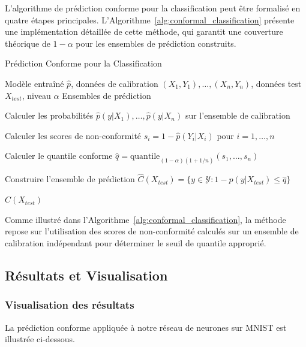 \documentclass[a4paper,12pt]{article}
\begin{document}
L'algorithme de prédiction conforme pour la classification peut être formalisé en quatre étapes principales. L'Algorithme~\ref{alg:conformal_classification} présente une implémentation détaillée de cette méthode, qui garantit une couverture théorique de $1-\alpha$ pour les ensembles de prédiction construits.

\begin{algorithm}
\caption{Prédiction Conforme pour la Classification}
\label{alg:conformal_classification}
\begin{algorithmic}[1]
\REQUIRE Modèle entraîné $\hat{p}$, données de calibration $(X_1, Y_1), \ldots, (X_n, Y_n)$, données test $X_{test}$, niveau $\alpha$
\ENSURE Ensembles de prédiction

\STATE Calculer les probabilités $\hat{p}(y|X_1), \ldots, \hat{p}(y|X_n)$ sur l'ensemble de calibration

\STATE Calculer les scores de non-conformité $s_i = 1 - \hat{p}(Y_i|X_i)$ pour $i = 1, \ldots, n$

\STATE Calculer le quantile conforme $\hat{q} = \text{quantile}_{(1-\alpha)(1+1/n)}(s_1, \ldots, s_n)$

\STATE Construire l'ensemble de prédiction $\hat{C}(X_{test}) = \{ y \in \mathcal{Y} : 1 - \hat{p}(y|X_{test}) \leq \hat{q} \}$

\RETURN $\hat{C}(X_{test})$
\end{algorithmic}
\end{algorithm}

Comme illustré dans l'Algorithme~\ref{alg:conformal_classification}, la méthode repose sur l'utilisation des scores de non-conformité calculés sur un ensemble de calibration indépendant pour déterminer le seuil de quantile approprié.

\subsection{Résultats et Visualisation}

\subsubsection{Visualisation des résultats}

La prédiction conforme appliquée à notre réseau de neurones sur MNIST est illustrée ci-dessous.
\end{document}
